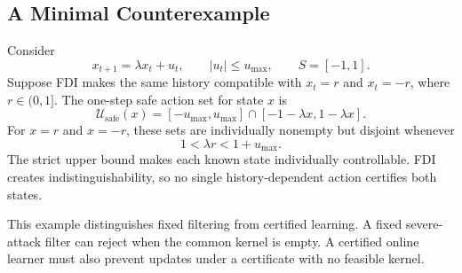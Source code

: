 \subsection{A Minimal Counterexample}

Consider
\begin{equation}
    x_{t+1}=\lambda x_t+u_t,\qquad |u_t|\le u_{\max},\qquad S=[-1,1].
\end{equation}
Suppose FDI makes the same history compatible with $x_t=r$ and $x_t=-r$,
where $r\in(0,1]$.  The one-step safe action set for state $x$ is
\begin{equation}
\mathcal U_{\mathrm{safe}}(x)=[-u_{\max},u_{\max}]\cap[-1-\lambda x,1-\lambda x].
\end{equation}
For $x=r$ and $x=-r$, these sets are individually nonempty but disjoint whenever
\begin{equation}
    1<\lambda r<1+u_{\max}.
\end{equation}
The strict upper bound makes each known state individually controllable.  FDI
creates indistinguishability, so no single history-dependent action certifies
both states.

This example distinguishes fixed filtering from certified learning.  A fixed
severe-attack filter can reject when the common kernel is empty.  A certified
online learner must also prevent updates under a certificate with no feasible
kernel.
